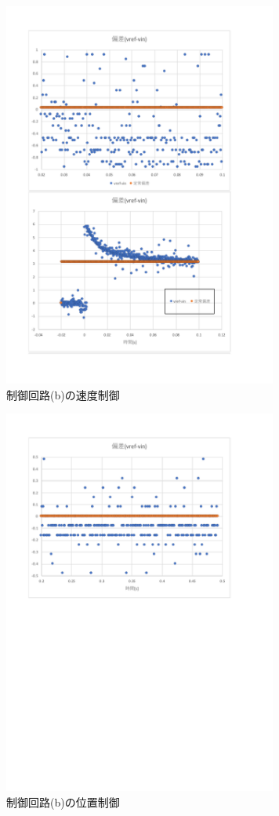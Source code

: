 \documentclass[uplatex, 11pt,a4j, titlepage]{jsarticle}
\begin{document}
\begin{figure}[h]
    \centering
    \includegraphics[width=9cm]{08in.pdf}
    \caption{制御回路(b)の速度制御}
    \label{08in}
\end{figure}

\begin{figure}[h]
    \centering
    \includegraphics[width=9cm]{09in.pdf}
    \caption{制御回路(b)の位置制御}
    \label{09in}
\end{figure}
\end{document}
